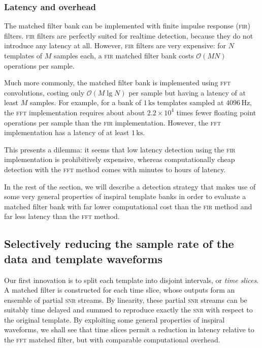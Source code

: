 \subsubsection{Latency and overhead}

The matched filter bank can be implemented with finite impulse response
(\textsc{fir}) filters.  \textsc{fir} filters are perfectly suited for realtime
detection, because they do not introduce any latency at all.  However,
\textsc{fir} filters are very expensive: for $N$ templates of $M$ samples each,
a \textsc{fir} matched filter bank costs $\mathcal O(M N)$ operations per
sample.

Much more commonly, the matched filter bank is implemented using \textsc{fft}
convolutions, costing only $\mathcal O(M \lg N)$  per sample but having a latency of
at least $M$ samples.  For example, for a bank of $1\,\mathrm{ks}$ templates
sampled at $4096\,\mathrm{Hz}$, the \textsc{fft} implementation requires about
about $2.2 \times 10^4$ times fewer floating point operations per sample than
the \textsc{fir} implementation.  However, the \textsc{fft} implementation has
a latency of at least $1\,\mathrm{ks}$.

This presents a dilemma: it seems that low latency detection using the
\textsc{fir} implementation is prohibitively expensive, whereas computationally
cheap detection with the \textsc{fft} method comes with minutes to hours of
latency.

In the rest of the section, we will describe a detection strategy that makes
use of some very general properties of inspiral template banks in order to
evaluate a matched filter bank with far lower computational cost than the
\textsc{fir} method and far less latency than the \textsc{fft} method.

\subsection{Selectively reducing the sample rate of the data and template waveforms}

Our first innovation is to split each template into disjoint intervals, or
\emph{time slices}.  A matched filter is constructed for each time slice, whose
outputs form an ensemble of partial \textsc{snr} streams.  By linearity, these
partial \textsc{snr} streams can be suitably time delayed and summed to
reproduce exactly the \textsc{snr} with respect to the original template.  By
exploiting some general properties of inspiral waveforms, we shall see that
time slices permit a reduction in latency relative to the \textsc{fft} matched
filter, but with comparable computational overhead.

